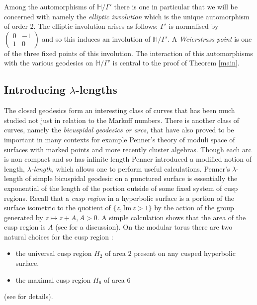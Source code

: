 \documentclass[12pt,a4paper]{amsart}
\def\HH{\mathbb{H}}
\def\im{\mathrm{Im}\,}
\def\xx{\HH/\Gamma'}
\begin{document}
Among the automorphisms of $\xx$ there is one in particular that we will be
concerned with namely the \textit{elliptic involution} which is the unique
automorphism of order 2. The elliptic involution arises as follows: $\Gamma'$
is normalised by $\begin{pmatrix} 0 & -1 \\ 1 & 0 \end{pmatrix}$ and so this
induces an involution of $\xx$. A \textit{Weierstrass point} is one of the
three fixed points of this involution. The interaction of this automorphisms
with the various geodesics on $\xx$ is central to the proof of Theorem
\ref{main}.

\subsection{Introducing $\lambda$-lengths}


The closed geodesics form an interesting class of curves that has been much
studied not just in relation to the Markoff numbers. There is another class of
curves, namely the \textit{bicuspidal geodesics or arcs}, that have also proved
to be important in many contexts for example Penner's theory of moduli space of
surfaces with marked points and more recently cluster algebras. Though each arc
is non compact and so has infinite length Penner \cite{bob} introduced a
modified notion of length, \textit{$\lambda$-length}, which allows one to
perform useful calculations.  Penner's $\lambda$-length of simple bicuspidal
geodesic on a punctured surface is essentially the exponential of  the length
of the portion outside of some fixed system of cusp regions. Recall that a
\textit{cusp region} in a hyperbolic surface is a portion of the surface
isometric to  the quotient of $\{ z, \im z > 1\}$ by the action of the group
generated by $z \mapsto z + A, A > 0$. A simple calculation shows that the area
of the cusp region is $A$ (see \cite{thesis} for a discussion). On the modular
torus there are two natural choices for the cusp region :

\begin{itemize}
\item the universal cusp region $H_2$  of area $2$ present on any cusped hyperbolic surface.
\item the  maximal cusp region $H_6$ of area $6$ 
\end{itemize}
(see \cite{thesis} for details).
\end{document}
